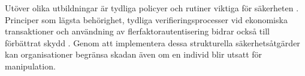 Utöver olika utbildningar är tydliga policyer och rutiner viktiga för säkerheten \cite{gururaj2024social_engineering}. Principer som lägsta behörighet, tydliga verifieringsprocesser vid ekonomiska transaktioner och 
användning av flerfaktorautentisering bidrar också till förbättrat skydd \cite{algarni2024comprehensive_taxonomy}. Genom att implementera dessa strukturella säkerhetsåtgärder kan organisationer begränsa skadan även om en 
individ blir utsatt för manipulation.